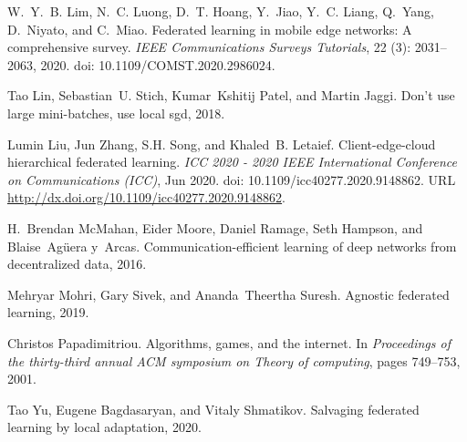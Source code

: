 \documentclass{article}
\newcommand{\doi}[1]{doi: #1}
\begin{document}
\begin{thebibliography}{23}
W.~Y.~B. {Lim}, N.~C. {Luong}, D.~T. {Hoang}, Y.~{Jiao}, Y.~C. {Liang},
  Q.~{Yang}, D.~{Niyato}, and C.~{Miao}.
\newblock Federated learning in mobile edge networks: A comprehensive survey.
\newblock \emph{IEEE Communications Surveys Tutorials}, 22
  (3): 2031--2063, 2020.
\newblock \doi{10.1109/COMST.2020.2986024}.

Tao Lin, Sebastian~U. Stich, Kumar~Kshitij Patel, and Martin Jaggi.
\newblock Don't use large mini-batches, use local sgd, 2018.

Lumin Liu, Jun Zhang, S.H. Song, and Khaled~B. Letaief.
\newblock Client-edge-cloud hierarchical federated learning.
\newblock \emph{ICC 2020 - 2020 IEEE International Conference on Communications
  (ICC)}, Jun 2020.
\newblock \doi{10.1109/icc40277.2020.9148862}.
\newblock URL \url{http://dx.doi.org/10.1109/icc40277.2020.9148862}.

H.~Brendan McMahan, Eider Moore, Daniel Ramage, Seth Hampson, and
  Blaise~Agüera y~Arcas.
\newblock Communication-efficient learning of deep networks from decentralized
  data, 2016.

Mehryar Mohri, Gary Sivek, and Ananda~Theertha Suresh.
\newblock Agnostic federated learning, 2019.

Christos Papadimitriou.
\newblock Algorithms, games, and the internet.
\newblock In \emph{Proceedings of the thirty-third annual ACM symposium on
  Theory of computing}, pages 749--753, 2001.

Tao Yu, Eugene Bagdasaryan, and Vitaly Shmatikov.
\newblock Salvaging federated learning by local adaptation, 2020.

\end{thebibliography}
\end{document}
